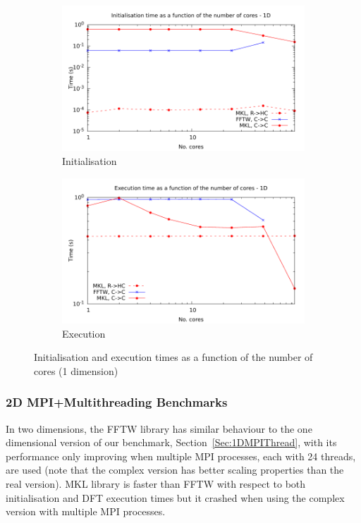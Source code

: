 \documentclass[12pt, a4paper]{article} \setlength{\textheight}{24cm}
\begin{document}
\begin{figure}[H]
  \centering
  \begin{subfigure}{.5\textwidth}
    \centering
    \includegraphics[width=.9\linewidth]{graphs/mpi-multh-init-1d.pdf}
    \caption{Initialisation}
    \label{1DMPIMULTHI}
  \end{subfigure}%
  \begin{subfigure}{.5\textwidth}
    \centering
    \includegraphics[width=.9\linewidth]{graphs/mpi-multh-exec-1d.pdf}
    \caption{Execution}
    \label{1DMPIMULTHE}
  \end{subfigure}
  \caption{Initialisation and execution times as a function of the
    number of cores (1 dimension)}
  \label{1DMPIMULTH}
\end{figure}




\subsubsection{2D MPI+Multithreading Benchmarks}
In two dimensions, the FFTW library has similar behaviour to the one
dimensional version of our benchmark, Section~\ref{Sec:1DMPIThread},
with its performance only improving when multiple MPI processes, each
with 24 threads, are used (note that the complex version has better
scaling properties than the real version). MKL library is faster than
FFTW with respect to both initialisation and DFT execution times but
it crashed when using the complex version with multiple MPI processes.
\end{document}

